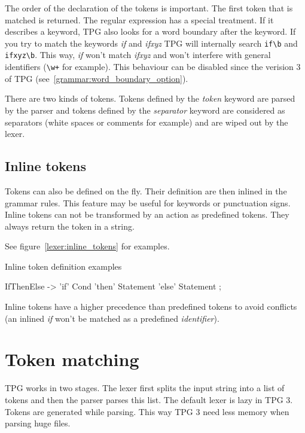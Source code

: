 The order of the declaration of the tokens is important. The first token that is matched is returned. The regular expression has a special treatment. If it describes a keyword, TPG also looks for a word boundary after the keyword. If you try to match the keywords \emph{if} and \emph{ifxyz} TPG will internally search \verb$if\b$ and \verb$ifxyz\b$. This way, \emph{if} won't match \emph{ifxyz} and won't interfere with general identifiers (\verb$\w+$ for example). This behaviour can be disabled since the verision 3 of TPG (see~\ref{grammar:word_boundary_option}).

There are two kinds of tokens. Tokens defined by the \emph{token} keyword are parsed by the parser and tokens defined by the \emph{separator} keyword are considered as separators (white spaces or comments for example) and are wiped out by the lexer.

\subsection{Inline tokens}

Tokens can also be defined on the fly. Their definition are then inlined in the grammar rules.
This feature may be useful for keywords or punctuation signs.
Inline tokens can not be transformed by an action as predefined tokens.
They always return the token in a string.

See figure~\ref{lexer:inline_tokens} for examples.

\begin{code}
\caption{Inline token definition examples}					\label{lexer:inline_tokens}
\begin{verbatimtab}[4]
	IfThenElse ->
		'if' Cond
		'then' Statement
		'else' Statement
		;
\end{verbatimtab}
\end{code}

Inline tokens have a higher precedence than predefined tokens to avoid conflicts (an inlined \emph{if} won't be matched as a predefined \emph{identifier}).

\section{Token matching}									\label{lexer:token_matching}

TPG works in two stages.
The lexer first splits the input string into a list of tokens and then the parser parses this list.
The default lexer is lazy in TPG 3. Tokens are generated while parsing.
This way TPG 3 need less memory when parsing huge files.

